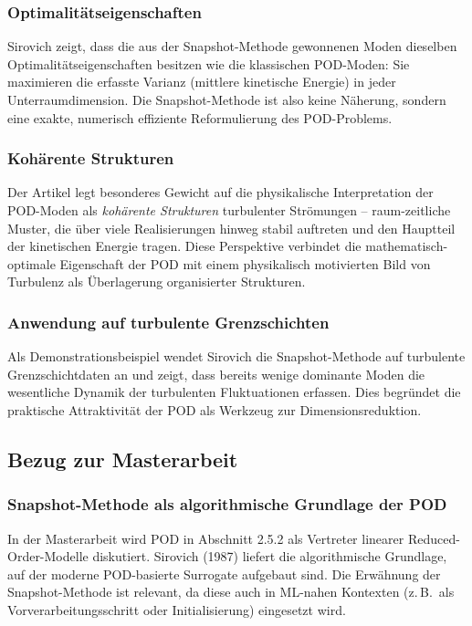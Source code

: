 \documentclass[a4paper,12pt]{article}
\begin{document}
\subsubsection*{Optimalitätseigenschaften}

Sirovich zeigt, dass die aus der Snapshot-Methode gewonnenen Moden dieselben Optimalitätseigenschaften besitzen wie die klassischen POD-Moden: Sie maximieren die erfasste Varianz (mittlere kinetische Energie) in jeder Unterraumdimension. Die Snapshot-Methode ist also keine Näherung, sondern eine exakte, numerisch effiziente Reformulierung des POD-Problems.

\subsubsection*{Kohärente Strukturen}

Der Artikel legt besonderes Gewicht auf die physikalische Interpretation der POD-Moden als \emph{kohärente Strukturen} turbulenter Strömungen -- raum-zeitliche Muster, die über viele Realisierungen hinweg stabil auftreten und den Hauptteil der kinetischen Energie tragen. Diese Perspektive verbindet die mathematisch-optimale Eigenschaft der POD mit einem physikalisch motivierten Bild von Turbulenz als Überlagerung organisierter Strukturen.

\subsubsection*{Anwendung auf turbulente Grenzschichten}

Als Demonstrationsbeispiel wendet Sirovich die Snapshot-Methode auf turbulente Grenzschichtdaten an und zeigt, dass bereits wenige dominante Moden die wesentliche Dynamik der turbulenten Fluktuationen erfassen. Dies begründet die praktische Attraktivität der POD als Werkzeug zur Dimensionsreduktion.

\subsection*{Bezug zur Masterarbeit}

\subsubsection*{Snapshot-Methode als algorithmische Grundlage der POD}

In der Masterarbeit wird POD in Abschnitt 2.5.2 als Vertreter linearer Reduced-Order-Modelle diskutiert. Sirovich (1987) liefert die algorithmische Grundlage, auf der moderne POD-basierte Surrogate aufgebaut sind. Die Erwähnung der Snapshot-Methode ist relevant, da diese auch in ML-nahen Kontexten (z.\,B.\ als Vorverarbeitungsschritt oder Initialisierung) eingesetzt wird.
\end{document}

